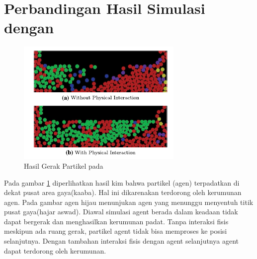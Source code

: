 \section{Perbandingan Hasil Simulasi dengan \citep{Kim2014} }%
\begin{figure}
\centering
\includegraphics[scale=0.6]{gambar/Kim2014}
\caption{Hasil Gerak Partikel pada \citep{Kim2014}}
\label{fig:figkim2014}
\end{figure}

\hspace{0.6cm} Pada gambar \ref{fig:figkim2014} diperlihatkan hasil kim bahwa partikel (agen) terpadatkan di dekat pusat area gaya(kaaba). Hal ini dikarenakan terdorong oleh kerumunan agen. Pada gambar agen hijau menunjukan agen yang menunggu menyentuh titik pusat gaya(hajar aswad). Diawal simulasi agent berada dalam keadaan tidak dapat bergerak dan menghasilkan kerumunan padat. Tanpa interaksi fisis meskipun ada ruang gerak, partikel agent tidak bisa memproses ke posisi selanjutnya. Dengan tambahan interaksi fisis dengan agent selanjutnya agent dapat terdorong oleh kerumunan.
